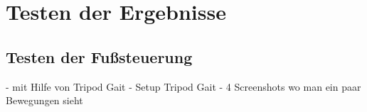 \chapter{Testen der Ergebnisse}

\section{Testen der Fußsteuerung}

- mit Hilfe von Tripod Gait
- Setup Tripod Gait
- 4 Screenshots wo man ein paar Bewegungen sieht